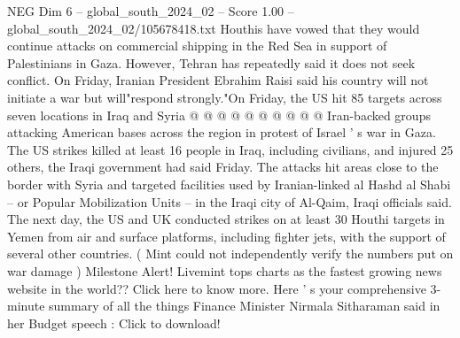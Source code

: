 \begin{textsample}{NEG Dim 6 – global\_south\_2024\_02 – Score 1.00 – global\_south\_2024\_02/105678418.txt}
Houthis have vowed that they would continue attacks on commercial shipping in the Red Sea in support of Palestinians in Gaza.
However, Tehran has repeatedly said it does not seek conflict.
On Friday, Iranian President Ebrahim Raisi said his country will not initiate a war but will"respond strongly."On Friday, the US hit 85 targets across seven locations in Iraq and Syria @ @ @ @ @ @ @ @ @ @ Iran-backed groups attacking American bases across the region in protest of Israel ' s war in Gaza.
The US strikes killed at least 16 people in Iraq, including civilians, and injured 25 others, the Iraqi government had said Friday.
The attacks hit areas close to the border with Syria and targeted facilities used by Iranian-linked al Hashd al Shabi -- or Popular Mobilization Units -- in the Iraqi city of Al-Qaim, Iraqi officials said.
The next day, the US and UK conducted strikes on at least 30 Houthi targets in Yemen from air and surface platforms, including fighter jets, with the support of several other countries. ( Mint could not independently verify the numbers put on war damage ) Milestone Alert!
Livemint tops charts as the fastest growing news website in the world??
Click here to know more.
Here ' s your comprehensive 3-minute summary of all the things Finance Minister Nirmala Sitharaman said in her Budget speech : Click to download!

\end{textsample}
